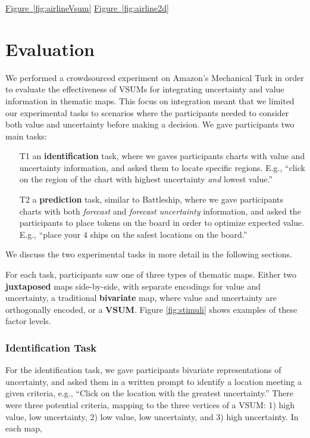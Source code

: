 \documentclass{vgtc}                          %
\newcommand{\figref}[1]{\hyperref[#1]{Figure~\ref*{#1}}}
\begin{document}
\airlineFig
\viralFig

\figref{fig:airlineVsum}
\figref{fig:airline2d}

\section{Evaluation}

\conditionFig

We performed a crowdsourced experiment on Amazon's Mechanical Turk in order to evaluate the effectiveness of VSUMs for integrating uncertainty and value information in thematic maps. This focus on integration meant that we limited our experimental tasks to scenarios where the participants needed to consider both value and uncertainty before making a decision. We gave participants two main tasks:

\begin{enumerate}
	\item [T1] an \textbf{identification} task, where we gaves participants charts with value and uncertainty information, and asked them to locate specific regions. E.g., ``click on the region of the chart with highest uncertainty \emph{and} lowest value.''
	\item [T2] a \textbf{prediction} task, similar to Battleship, where we gave participants charts with both \emph{forecast} and \emph{forecast uncertainty} information, and asked the participants to place tokens on the board in order to optimize expected value. E.g., ``place your $4$ ships on the safest locations on the board.''
\end{enumerate}

We discuss the two experimental tasks in more detail in the following sections.

For each task, participants saw one of three types of thematic maps. Either two \textbf{juxtaposed} maps side-by-side, with separate encodings for value and uncertainty, a traditional \textbf{bivariate} map, where value and uncertainty are orthogonally encoded, or a \textbf{VSUM}. Figure \ref{fig:stimuli} shows examples of these factor levels.

\subsubsection{Identification Task}

For the identification task, we gave participants bivariate representations of uncertainty, and asked them in a written prompt to identify a location meeting a given criteria, e.g., ``Click on the location with the greatest uncertainty.'' There were three potential criteria, mapping to the three vertices of a VSUM: 1) high value, low uncertainty, 2) low value, low uncertainty, and 3) high uncertainty. In each map, 
\end{document}
